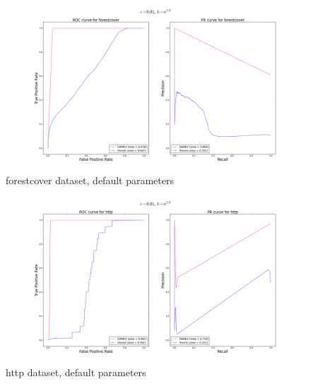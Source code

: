 \begin{figure}[!ht]
  \centering
  \includegraphics[width = \textwidth]{fig_source/forestcover-semi-supervised-average-rect-01.png}
  \caption{forestcover dataset, default parameters}
\label{jmva:fig:forestcover}
\end{figure}

\begin{figure}[!ht]
  \centering
  \includegraphics[width = \textwidth]{fig_source/http-3d-semi-supervised-average-rect-01.png}
  \caption{http dataset, default parameters}
\label{jmva:fig:http}
\end{figure}

